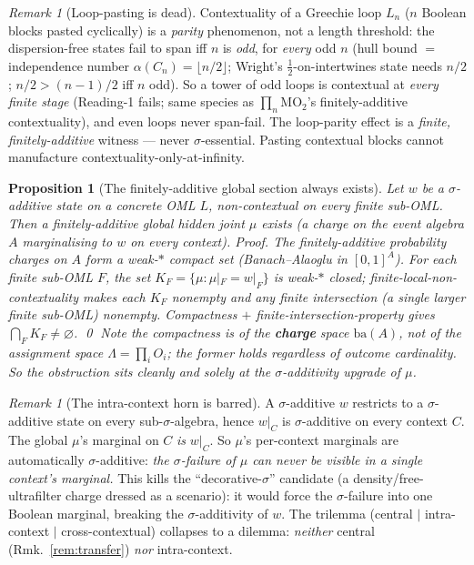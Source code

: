 \documentclass[11pt]{article}
\newtheorem{proposition}[theorem]{Proposition}
\theoremstyle{definition}
\theoremstyle{remark}
\newtheorem{remark}[theorem]{Remark}
\newcommand{\MOO}{\mathrm{MO}_2}
\begin{document}
\begin{remark}[Loop-pasting is dead]\label{rem:loopdead}
Contextuality of a Greechie loop $L_n$ ($n$ Boolean blocks pasted cyclically) is a
\emph{parity} phenomenon, not a length threshold: the dispersion-free states fail to
span iff $n$ is \emph{odd}, for \emph{every} odd $n$ (hull bound $=$ independence
number $\alpha(C_n)=\lfloor n/2\rfloor$; Wright's $\tfrac12$-on-intertwines state
needs $n/2$; $n/2>(n-1)/2$ iff $n$ odd). So a tower of odd loops is contextual at
\emph{every finite stage} (Reading-1 fails; same species as $\prod_n\MOO$'s
finitely-additive contextuality), and even loops never span-fail. The loop-parity
effect is a \emph{finite, finitely-additive} witness --- never $\sigma$-essential.
Pasting contextual blocks cannot manufacture contextuality-only-at-infinity.
\end{remark}

\begin{proposition}[The finitely-additive global section always exists]\label{prop:facompact}
Let $w$ be a $\sigma$-additive state on a concrete OML $L$, non-contextual on every
finite sub-OML. Then a \emph{finitely-additive} global hidden joint $\mu$ exists
(a charge on the event algebra $A$ marginalising to $w$ on every context).
\emph{Proof.} The finitely-additive probability charges on $A$ form a weak-$*$
compact set (Banach--Alaoglu in $[0,1]^A$). For each finite sub-OML $F$, the set
$K_F=\{\mu:\mu|_F=w|_F\}$ is weak-$*$ closed; finite-local-non-contextuality makes
each $K_F$ nonempty and any finite intersection (a single larger finite sub-OML)
nonempty. Compactness $+$ finite-intersection-property gives
$\bigcap_F K_F\neq\varnothing$. \qed
\emph{Note the compactness is of the \textbf{charge} space} $\mathrm{ba}(A)$, not of
the assignment space $\Lambda=\prod_i O_i$; the former holds regardless of
outcome cardinality. So the obstruction sits cleanly and solely at the
$\sigma$-additivity upgrade of $\mu$.
\end{proposition}

\begin{remark}[The intra-context horn is barred]\label{rem:nointra}
A $\sigma$-additive $w$ restricts to a $\sigma$-additive state on every
sub-$\sigma$-algebra, hence $w|_C$ is $\sigma$-additive on every context $C$. The
global $\mu$'s marginal on $C$ \emph{is} $w|_C$. So $\mu$'s per-context marginals
are automatically $\sigma$-additive: \emph{the $\sigma$-failure of $\mu$ can never
be visible in a single context's marginal.} This kills the ``decorative-$\sigma$''
candidate (a density/free-ultrafilter charge dressed as a scenario): it would force
the $\sigma$-failure into one Boolean marginal, breaking the $\sigma$-additivity of
$w$. The trilemma (central $\mid$ intra-context $\mid$ cross-contextual) collapses to
a dilemma: \emph{neither} central (Rmk.~\ref{rem:transfer}) \emph{nor} intra-context.
\end{remark}
\end{document}
